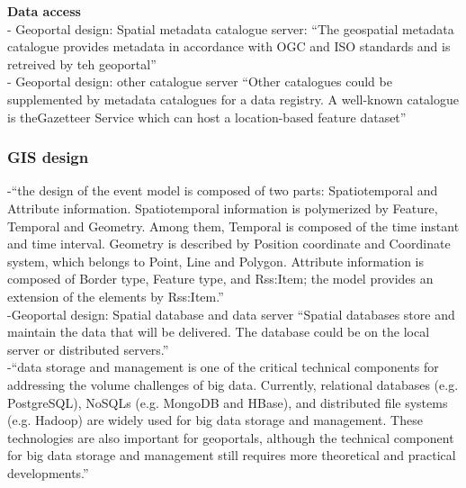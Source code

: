 \textbf{Data access}\\
-{\color{orange} Geoportal design: Spatial metadata catalogue server: ``The geospatial metadata catalogue provides metadata in accordance with OGC and ISO standards and is retreived by teh geoportal'' \cite{Jaing2020}}\\
-{\color{orange} Geoportal design: other catalogue server ``Other catalogues could be supplemented by metadata catalogues for a data registry. A well-known catalogue is theGazetteer Service which can host a location-based feature dataset'' \cite{Jiang2020}}\\

\subsubsection{GIS design}
-{\color{orange}“the design of the event model is composed of two parts: Spatiotemporal and Attribute information. Spatiotemporal information is polymerized by Feature, Temporal and Geometry. Among them, Temporal is composed of the time instant and time interval. Geometry is described by Position coordinate and Coordinate system, which belongs to Point, Line and Polygon. Attribute information is composed of Border type, Feature type, and Rss:Item; the model provides an extension of the elements by Rss:Item.”}\cite{Xing2015}\\
-{\color{orange}Geoportal design: Spatial database and data server ``Spatial databases store and maintain the data that will be delivered. The database could be on the local server or distributed servers.''\cite{Jiang2020}}\\
-{\color{orange}“data storage and management is one of the critical technical components for addressing the volume challenges of big data. Currently, relational databases (e.g. PostgreSQL), NoSQLs (e.g. MongoDB and HBase), and distributed file systems (e.g. Hadoop) are widely used for big data storage and management. These technologies are also important for geoportals, although the technical component for big data storage and management still requires more theoretical and practical developments.” \cite{Jiang2020}}\\

